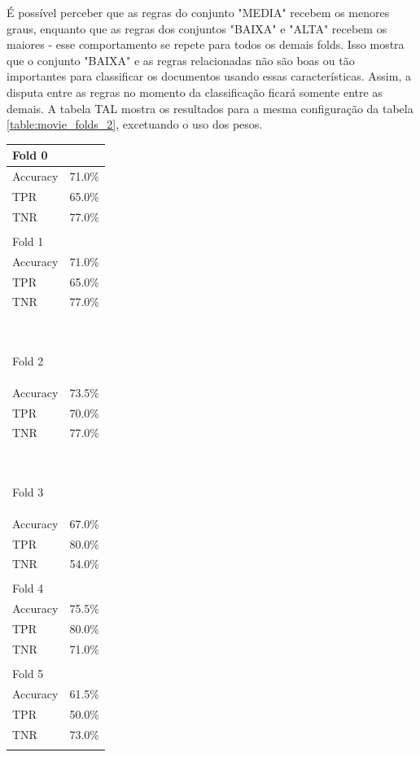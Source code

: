 \documentclass[template.tex]{subfiles}
\begin{document}
É possível perceber que as regras do conjunto "MEDIA" recebem os menores graus, enquanto que as regras dos conjuntos "BAIXA" e "ALTA" recebem os maiores - esse comportamento se repete para todos os demais folds. Isso mostra que o conjunto "BAIXA" e as regras relacionadas não são boas ou tão importantes para classificar os documentos usando essas características. Assim, a disputa entre as regras no momento da classificação ficará somente entre as demais. A tabela TAL mostra os resultados para a mesma configuração da tabela \ref{table:movie_folds_2}, excetuando o uso dos pesos. 

\begin{table}[H]
	\centering
    \begin{tabular}{ll}
    Fold 0 \\ \hline
    Accuracy &  71.0\% \\
	TPR &  65.0\% \\
	TNR &  77.0\% \\ \\
	
	Fold 1 \\ \hline
    Accuracy &  71.0\% \\
	TPR &  65.0\% \\
	TNR &  77.0\% \\ \
	
	Fold 2 \\ \hline
    Accuracy &  73.5\% \\
	TPR &  70.0\% \\
	TNR &  77.0\% \\ \
	
	Fold 3 \\ \hline
    Accuracy &  67.0\% \\
	TPR &  80.0\% \\
	TNR &  54.0\% \\ \\
	
	Fold 4 \\ \hline
    Accuracy &  75.5\% \\
	TPR &  80.0\% \\
	TNR &  71.0\% \\ \\
	
	Fold 5 \\ \hline
    Accuracy &  61.5\% \\
	TPR & 50.0\% \\
	TNR &  73.0\% \\ \\
	

\end{tabular}
\end{table}
\end{document}
